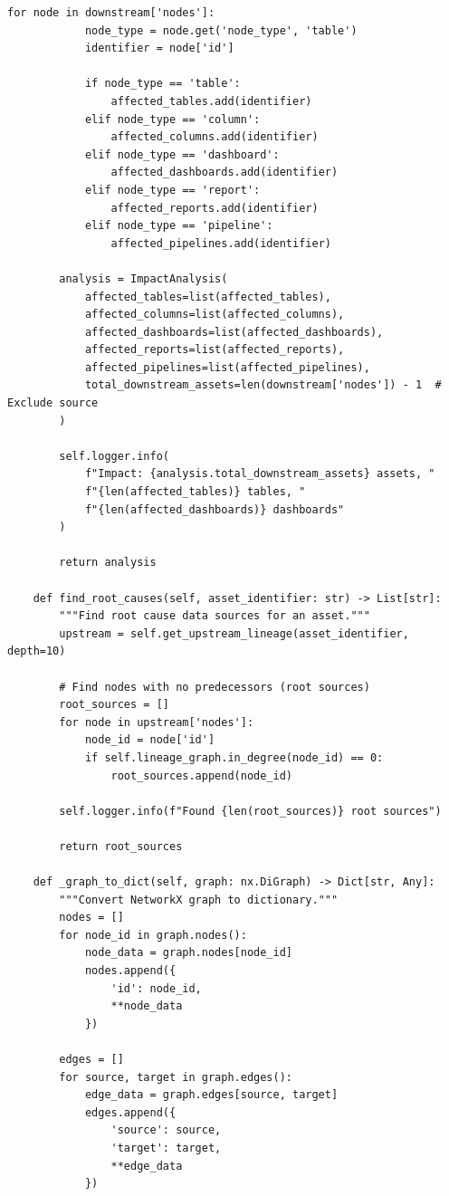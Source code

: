 \begin{lstlisting}[style=python, caption=LineageTracker with Column-Level Dependencies]
        for node in downstream['nodes']:
            node_type = node.get('node_type', 'table')
            identifier = node['id']

            if node_type == 'table':
                affected_tables.add(identifier)
            elif node_type == 'column':
                affected_columns.add(identifier)
            elif node_type == 'dashboard':
                affected_dashboards.add(identifier)
            elif node_type == 'report':
                affected_reports.add(identifier)
            elif node_type == 'pipeline':
                affected_pipelines.add(identifier)

        analysis = ImpactAnalysis(
            affected_tables=list(affected_tables),
            affected_columns=list(affected_columns),
            affected_dashboards=list(affected_dashboards),
            affected_reports=list(affected_reports),
            affected_pipelines=list(affected_pipelines),
            total_downstream_assets=len(downstream['nodes']) - 1  # Exclude source
        )

        self.logger.info(
            f"Impact: {analysis.total_downstream_assets} assets, "
            f"{len(affected_tables)} tables, "
            f"{len(affected_dashboards)} dashboards"
        )

        return analysis

    def find_root_causes(self, asset_identifier: str) -> List[str]:
        """Find root cause data sources for an asset."""
        upstream = self.get_upstream_lineage(asset_identifier, depth=10)

        # Find nodes with no predecessors (root sources)
        root_sources = []
        for node in upstream['nodes']:
            node_id = node['id']
            if self.lineage_graph.in_degree(node_id) == 0:
                root_sources.append(node_id)

        self.logger.info(f"Found {len(root_sources)} root sources")

        return root_sources

    def _graph_to_dict(self, graph: nx.DiGraph) -> Dict[str, Any]:
        """Convert NetworkX graph to dictionary."""
        nodes = []
        for node_id in graph.nodes():
            node_data = graph.nodes[node_id]
            nodes.append({
                'id': node_id,
                **node_data
            })

        edges = []
        for source, target in graph.edges():
            edge_data = graph.edges[source, target]
            edges.append({
                'source': source,
                'target': target,
                **edge_data
            })


\end{lstlisting}
